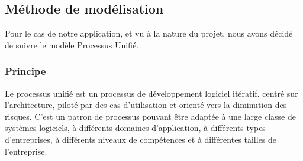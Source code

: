 \documentclass[12 pt]{report}
\begin{document}
\subsection{  Méthode de modélisation }
Pour le cas de notre application, et vu à la nature du projet, nous avons décidé de suivre le modèle Processus Unifié.
\subsubsection{Principe}
Le processus unifié est un processus de développement logiciel itératif, centré sur l'architecture, piloté par des cas d'utilisation et orienté vers la diminution des risques. C’est un patron de processus pouvant être adaptée à une large classe de systèmes logiciels, à différents domaines d'application, à différents types d'entreprises, à différents niveaux de compétences et à différentes tailles de l'entreprise.
\newpage
\end{document}
